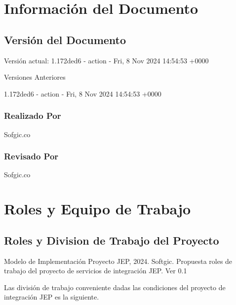 \documentclass[
  paper=a4,
  ,captions=tableheading
]{scrartcl}
\renewenvironment{quote}{\begin{customblockquote}\list{}{\rightmargin=0em\leftmargin=0em}%
\item\relax\color{blockquote-text}\ignorespaces}{\unskip\unskip\endlist\end{customblockquote}}
\begin{document}
\newpage

\section{Información del
Documento}\label{sec:informaciuxf3n-del-documento}

\subsection{Versión del Documento}\label{sec:versiuxf3n-del-documento}

\begin{quote}
\end{quote}

Versión actual: 1.172ded6 - action - Fri, 8 Nov 2024 14:54:53 +0000

Versiones Anteriores

1.172ded6 - action - Fri, 8 Nov 2024 14:54:53 +0000

\subsubsection{Realizado Por}\label{sec:realizado-por}

Sofgic.co

\subsubsection{Revisado Por}\label{sec:revisado-por}

Sofgic.co

\newpage

\section{Roles y Equipo de Trabajo}\label{sec:roles-y-equipo-de-trabajo}

\subsection{Roles y Division de Trabajo del
Proyecto}\label{sec:roles-y-division-de-trabajo-del-proyecto}

\begin{quote}
Modelo de Implementación Proyecto JEP, 2024. Softgic. Propuesta roles de
trabajo del proyecto de servicios de integración JEP. Ver 0.1
\end{quote}

Las división de trabajo conveniente dadas las condiciones del proyecto
de integración JEP es la siguiente.
\end{document}
